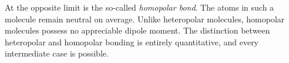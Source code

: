 At the opposite limit is the so-called \emph{homopolar bond}. The atoms in such a molecule remain neutral on average. Unlike heteropolar molecules, homopolar molecules possess no appreciable dipole moment. The distinction between heteropolar and homopolar bonding is entirely quantitative, and every intermediate case is possible.
